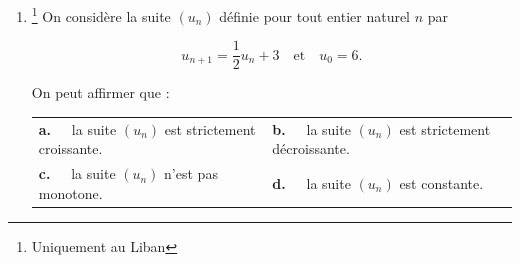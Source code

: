\documentclass[10pt]{article}
\begin{document}
\begin{enumerate}[resume]
\item \footnote{Uniquement au Liban} On considère la suite $\left(u_n\right)$ définie pour tout entier naturel $n$ par

\[u_{n+1} = \dfrac12u_n + 3\quad \text{et}\quad u_0 = 6.\]

On peut affirmer que :

\begin{center}
\begin{tabularx}{\linewidth}{*{2}{X}}
\textbf{a.~~} la suite $\left(u_n\right)$ est strictement croissante.&\textbf{b.~~} la suite $\left(u_n\right)$ est strictement décroissante.\\
\textbf{c.~~} la suite $\left(u_n\right)$ n'est pas monotone. &\textbf{d.~~} la suite $\left(u_n\right)$ est constante.
\end{tabularx}
\end{center}
\end{enumerate}

\bigskip
\end{document}
